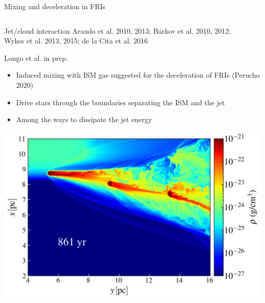 \begin{frame}{Mixing and deceleration in FRIs}
\begin{columns}
\begin{column}{.5\textwidth}
			\begin{exampleblock}{Jet/cloud interaction}
				{\tiny 	Araudo et al. 2010, 2013;
				Barkov et al. 2010, 2012; \\
				Wykes et al. 2013, 2015;
				de la Cita et al. 2016}
			\end{exampleblock}
				{\tiny
			\begin{block}{Longo et al. in prep.}
				\begin{itemize}
				\item Induced mixing with ISM gas suggested for the deceleration
					of FRIs (Perucho 2020)
				\item Drive stars through the boundaries separating the ISM and the jet
				\item Among the ways to dissipate the jet energy
			    \end{itemize}
			\end{block}
				}
				
			\includegraphics[width=\linewidth]{images/jbs3_130.png}
		\end{column}
	\end{columns}
\end{frame}

